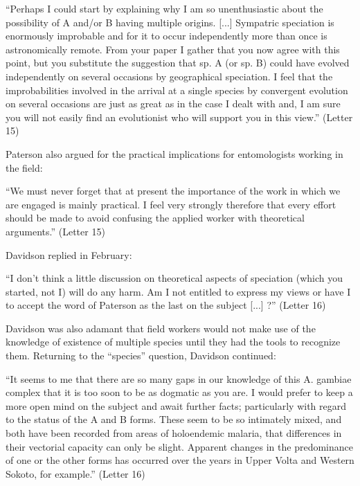 \documentclass[a4paper,11pt,abstracton,hidelinks]{scrartcl}
\begin{document}
\begin{displayquote}
``Perhaps I could start by explaining why I am so unenthusiastic about the possibility of A and/or B having multiple origins. [...] Sympatric speciation is enormously improbable and for it to occur independently more than once is astronomically remote. From your paper I gather that you now agree with this point, but you substitute the suggestion that sp. A (or sp. B) could have evolved independently on several occasions by geographical speciation. I feel that the improbabilities involved in the arrival at a single species by convergent evolution on several occasions are just as great as in the case I dealt with and, I am sure you will not easily find an evolutionist who will support you in this view.'' (Letter 15)
\end{displayquote}


Paterson also argued for the practical implications for entomologists working in the field:

\begin{displayquote}
``We must never forget that at present the importance of the work in which we are engaged is mainly practical. I feel very strongly therefore that every effort should be made to avoid confusing the applied worker with theoretical arguments.'' (Letter 15)
\end{displayquote}


Davidson replied in February:

\begin{displayquote}
``I don't think a little discussion on theoretical aspects of speciation (which you started, not I) will do any harm. Am I not entitled to express my views or have I to accept the word of Paterson as the last on the subject [...] ?'' (Letter 16)
\end{displayquote}


Davidson was also adamant that field workers would not make use of the knowledge of existence of multiple species until they had the tools to recognize them. Returning to the ``species'' question, Davidson continued:


\begin{displayquote}
``It seems to me that there are so many gaps in our knowledge of this A. gambiae complex that it is too soon to be as dogmatic as you are. I would prefer to keep a more open mind on the subject and await further facts; particularly with regard to the status of the A and B forms. These seem to be so intimately mixed, and both have been recorded from areas of holoendemic malaria, that differences in their vectorial capacity can only be slight. Apparent changes in the predominance of one or the other forms has occurred over the years in Upper Volta and Western Sokoto, for example.'' (Letter 16)
\end{displayquote}
\end{document}
